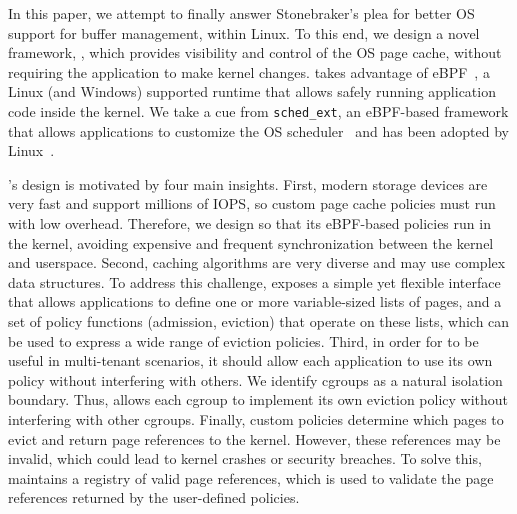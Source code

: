 In this paper, we attempt to finally answer Stonebraker's plea for better OS support for buffer management, within Linux. To this end, we design a novel framework, \name, which provides visibility and control of the OS page cache, without requiring the application to make kernel changes. \name takes advantage of eBPF~\cite{ebpf}, a Linux (and Windows) supported runtime that allows safely running application code inside the kernel. We take a cue from \texttt{sched\_ext}, an eBPF-based framework that allows applications to customize the OS scheduler~\cite{syrup,ghost} and has been adopted by Linux~\cite{sched_ext}.


\name's design is motivated by four main insights. First, modern storage devices are very fast and support millions of IOPS, so custom page cache policies must run with low overhead. Therefore, we design \name so that its eBPF-based policies run in the kernel, avoiding expensive and frequent synchronization between the kernel and userspace.
Second, caching algorithms are very diverse and may use complex data structures. %
To address this challenge, \name exposes a simple yet flexible interface that allows applications to define one or more variable-sized lists of pages, and a set of policy functions (\eg admission, eviction) that operate on these lists, which can be used to express a wide range of eviction policies.
Third, in order for \name to be useful in multi-tenant scenarios, it should allow each application to use its own policy without interfering with others. We identify cgroups as a natural isolation boundary. Thus, \name allows each cgroup to implement its own eviction policy without interfering with other cgroups.
Finally, custom policies determine which pages to evict and return page references to the kernel. However, these references may be invalid, which could lead to kernel crashes or security breaches. To solve this, \name maintains a registry of valid page references, which is used to validate the page references returned by the user-defined policies.

